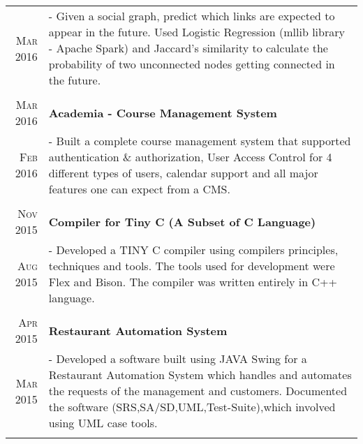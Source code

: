 \documentclass[a4paper,10pt]{extarticle} %
\begin{document}
\begin{tabular}{r|p{16cm}}
\textsc{\normalsize{Mar 2016}}  & \footnotesize{- Given a social graph, predict which links are expected to appear in the future. Used Logistic Regression (mllib library - Apache Spark) and Jaccard's similarity to calculate the probability of two unconnected nodes getting connected in the future.}\\
\multicolumn{2}{c}{} \\


\textsc{\normalsize{Mar 2016}} & \textbf{\normalsize{Academia - Course Management System}}\\
\textsc{\normalsize{Feb 2016}} & \footnotesize{- Built a complete course management system that supported authentication \& authorization, User Access Control for 4 different types of users, calendar support and all major features one can expect from a CMS. }\\
\multicolumn{2}{c}{} \\

\textsc{\normalsize{Nov 2015}} & \textbf{\normalsize{Compiler for Tiny C (A Subset of C Language)}}\\
\textsc {\normalsize{Aug 2015}} & \footnotesize{- Developed a TINY C compiler using compilers principles, techniques and tools. The tools used for development were Flex and Bison. The compiler was written entirely in C++ language.}\\
\multicolumn{2}{c}{} \\

\textsc{\normalsize{Apr 2015}} & \textbf{\normalsize{Restaurant Automation System}}\\
\textsc {\normalsize{Mar 2015}} & \footnotesize{- Developed a software built using JAVA Swing for a Restaurant Automation System which handles and automates the requests of the management and customers. Documented the software (SRS,SA/SD,UML,Test-Suite),which involved using UML case tools.}\\
\multicolumn{2}{c}{} \\
\end{tabular}
\end{document}
